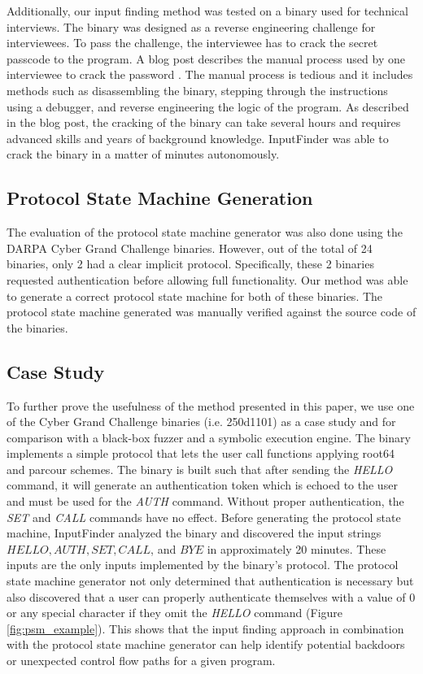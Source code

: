 \documentclass{acm_proc_article-sp}
\def \tool {InputFinder}
\def \numbinaries {24}
\begin{document}
Additionally, our input finding method was tested on a binary used for technical interviews.
The binary was designed as a reverse engineering challenge for interviewees.
To pass the challenge, the interviewee has to crack the secret passcode to the program.
A blog post describes the manual process used by one interviewee to crack the password \cite{interviewbinary}.
The manual process is tedious and it includes methods such as disassembling the binary, stepping through the instructions using a debugger, and reverse engineering the logic of the program.
As described in the blog post, the cracking of the binary can take several hours and requires advanced skills and years of background knowledge.
\tool{} was able to crack the binary in a matter of minutes autonomously.

\subsection{Protocol State Machine Generation}
The evaluation of the protocol state machine generator was also done using the DARPA Cyber Grand Challenge binaries.
However, out of the total of \numbinaries{} binaries, only 2 had a clear implicit protocol.
Specifically, these 2 binaries requested authentication before allowing full functionality.
Our method was able to generate a correct protocol state machine for both of these binaries.
The protocol state machine generated was manually verified against the source code of the binaries.

\subsection{Case Study}
To further prove the usefulness of the method presented in this paper, we use one of the Cyber Grand Challenge binaries (i.e. 250d1101) as a case study and for comparison with a black-box fuzzer and a symbolic execution engine.
The binary implements a simple protocol that lets the user call functions applying root64 and parcour schemes.
The binary is built such that after sending the \textit{HELLO} command, it will generate an authentication token which is echoed to the user and must be used for the \textit{AUTH} command.
Without proper authentication, the \textit{SET} and \textit{CALL} commands have no effect.
Before generating the protocol state machine, \tool{} analyzed the binary and discovered the input strings $HELLO, AUTH, SET, CALL$, and $BYE$ in approximately 20 minutes.
These inputs are the only inputs implemented by the binary's protocol.
The protocol state machine generator not only determined that authentication is necessary but also discovered that a user can properly authenticate themselves with a value of 0 or any special character if they omit the \textit{HELLO} command (Figure \ref{fig:psm_example}).
This shows that the input finding approach in combination with the protocol state machine generator can help identify potential backdoors or unexpected control flow paths for a given program.
\end{document}
